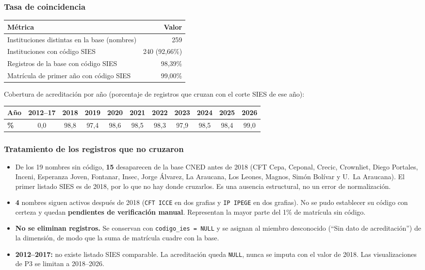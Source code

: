\documentclass[11pt,a4paper]{article}
\begin{document}
\subsubsection{Tasa de coincidencia}
\begin{center}
\begin{tabular}{@{}lr@{}}
\toprule
\textbf{M\'etrica} & \textbf{Valor} \\
\midrule
Instituciones distintas en la base (nombres) & 259 \\
Instituciones con c\'odigo SIES & 240 (92,66\%) \\
Registros de la base con c\'odigo SIES & 98,39\% \\
Matr\'icula de primer a\~no con c\'odigo SIES & 99,00\% \\
\bottomrule
\end{tabular}
\end{center}

Cobertura de acreditaci\'on por a\~no (porcentaje de registros que cruzan con el corte SIES de ese a\~no):

\begin{center}
\small
\begin{tabular}{@{}lcccccccccc@{}}
\toprule
\textbf{A\~no} & 2012--17 & 2018 & 2019 & 2020 & 2021 & 2022 & 2023 & 2024 & 2025 & 2026 \\
\midrule
\textbf{\%} & 0,0 & 98,8 & 97,4 & 98,6 & 98,5 & 98,3 & 97,9 & 98,5 & 98,4 & 99,0 \\
\bottomrule
\end{tabular}
\end{center}

\subsubsection{Tratamiento de los registros que no cruzaron}
\begin{itemize}
    \item De los 19 nombres sin c\'odigo, \textbf{15} desaparecen de la base CNED antes de 2018 (CFT Cepa, Ceponal, Crecic, Crownliet, Diego Portales, Inceni, Esperanza Joven, Fontanar, Insec, Jorge \'Alvarez, La Araucana, Los Leones, Magnos, Sim\'on Bol\'ivar y U.\ La Araucana). El primer listado SIES es de 2018, por lo que no hay donde cruzarlos. Es una ausencia estructural, no un error de normalizaci\'on.
    \item \textbf{4} nombres siguen activos despu\'es de 2018 (\texttt{CFT ICCE} en dos grafias y \texttt{IP IPEGE} en dos grafias). No se pudo establecer su c\'odigo con certeza y quedan \textbf{pendientes de verificaci\'on manual}. Representan la mayor parte del 1\% de matr\'icula sin c\'odigo.
    \item \textbf{No se eliminan registros.} Se conservan con \texttt{codigo\_ies = NULL} y se asignan al miembro desconocido (``Sin dato de acreditaci\'on'') de la dimensi\'on, de modo que la suma de matr\'icula cuadre con la base.
    \item \textbf{2012--2017:} no existe listado SIES comparable. La acreditaci\'on queda \texttt{NULL}, nunca se imputa con el valor de 2018. Las visualizaciones de P3 se limitan a 2018--2026.
\end{itemize}
\end{document}

